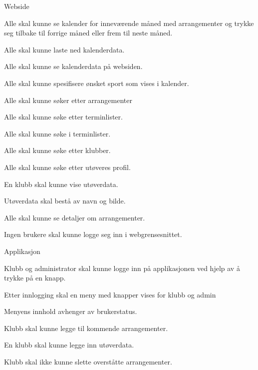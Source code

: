 \documentclass[norsk]{article}
\begin{document}
\begin{legal}

    \item Webside
    \begin{legal}
        \item Alle skal kunne se kalender for inneværende måned med arrangementer og trykke seg tilbake til forrige måned eller frem til neste måned.
        \item Alle skal kunne laste ned kalenderdata. 
        \item Alle skal kunne se kalenderdata på websiden.
        \item Alle skal kunne spesifisere ønsket sport som vises i kalender.
        \item Alle skal kunne søker etter arrangementer
        \item Alle skal kunne søke etter terminlister.
        \item Alle skal kunne søke i terminlister.
        \item Alle skal kunne søke etter klubber.
        \item Alle skal kunne søke etter utøveres profil. 
        \item En klubb skal kunne vise utøverdata.
        \begin{legal}
            \item Utøverdata skal bestå av navn og bilde.
        \end {legal}
        \item Alle skal kunne se detaljer om arrangementer.
        \item Ingen brukere skal kunne logge seg inn 
        i webgrensesnittet.
    \end{legal}
    \item Applikasjon
    \begin{legal}
        \item Klubb og administrator skal kunne logge inn på  applikasjonen ved hjelp av å trykke på en knapp.
        \item Etter innlogging skal en meny med knapper vises for klubb og admin
        \begin{legal}
            \item Menyens innhold avhenger av brukerstatus.
        \end{legal}
        \item Klubb skal kunne legge til kommende arrangementer.
        \item En klubb skal kunne legge inn utøverdata.
        \item Klubb skal ikke kunne slette overståtte arrangementer.

\end{legal}
\end{legal}
\end{document}
